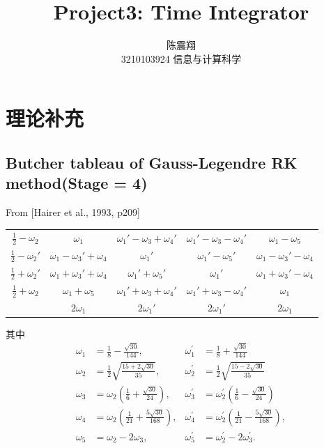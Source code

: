 \documentclass{article}
\title{{\bf Project3: Time Integrator}}
\author{陈震翔\\3210103924 信息与计算科学}
\date{}
\begin{document}
\maketitle

\section{理论补充}

\subsection{Butcher tableau of Gauss-Legendre RK method(Stage = 4)}

From [Hairer et al., 1993, p209]
\begin{table}[!ht]
    \centering
    \begin{tabular}{c|cccc}
        $\frac{1}{2}-\omega_2$ & $\omega_1$ & $\omega_1'-\omega_3+\omega_4'$ & $\omega_1'-\omega_3-\omega_4'$ & $\omega_1-\omega_5$\\
        $\frac{1}{2}-\omega_2'$ & $\omega_1-\omega_3'+\omega_4$ & $\omega_1'$ & $\omega_1'-\omega_5'$ & $\omega_1-\omega_3'-\omega_4$\\
        $\frac{1}{2}+\omega_2'$ & $\omega_1+\omega_3'+\omega_4$ & $\omega_1'+\omega_5'$ & $\omega_1'$ & $\omega_1+\omega_3'-\omega_4$\\
        $\frac{1}{2}+\omega_2$ & $\omega_1+\omega_5$ & $\omega_1'+\omega_3+\omega_4'$ & $\omega_1'+\omega_3-\omega_4'$ & $\omega_1$ \\ \hline
        & $2\omega_1$ & $2\omega_1'$ & $2\omega_1'$ & $2\omega_1$
    \end{tabular}
\end{table}

其中
$$
\begin{array}{llrl}
    \omega_{1} & =\frac{1}{8}-\frac{\sqrt{30}}{144}, & \omega_{1}^{\prime} & =\frac{1}{8}+\frac{\sqrt{30}}{144} \\
    \omega_{2} & =\frac{1}{2} \sqrt{\frac{15+2 \sqrt{30}}{35}}, & \omega_{2}^{\prime} & =\frac{1}{2} \sqrt{\frac{15-2 \sqrt{30}}{35}} \\
    \omega_{3} & =\omega_{2}\left(\frac{1}{6}+\frac{\sqrt{30}}{24}\right), & \omega_{3}^{\prime} & =\omega_{2}^{\prime}\left(\frac{1}{6}-\frac{\sqrt{30}}{24}\right) \\
    \omega_{4} & =\omega_{2}\left(\frac{1}{21}+\frac{5 \sqrt{30}}{168}\right), & \omega_{4}^{\prime} &=\omega_{2}^{\prime}\left(\frac{1}{21}-\frac{5 \sqrt{30}}{168}\right), \\
    \omega_{5} & =\omega_{2}-2 \omega_{3}, & \omega_{5}^{\prime} & =\omega_{2}^{\prime}-2 \omega_{3}^{\prime} .
\end{array}
$$
\end{document}
